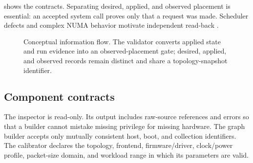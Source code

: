  shows the contracts. Separating desired, applied, and observed placement is essential: an accepted system call proves only that a request was made. Scheduler defects and complex NUMA behavior motivate independent read-back \cite{lozi2016linuxscheduler}.

\begin{figure}[t]
  \centering
  \caption{Conceptual information flow. The validator converts applied state and run evidence into an observed-placement gate; desired, applied, and observed records remain distinct and share a topology-snapshot identifier.}
  \label{fig:architecture}
\end{figure}

\subsection{Component contracts}

The inspector is read-only. Its output includes raw-source references and errors so that a builder cannot mistake missing privilege for missing hardware. The graph builder accepts only mutually consistent host, boot, and collection identifiers. The calibrator declares the topology, frontend, firmware/driver, clock/power profile, packet-size domain, and workload range in which its parameters are valid.

